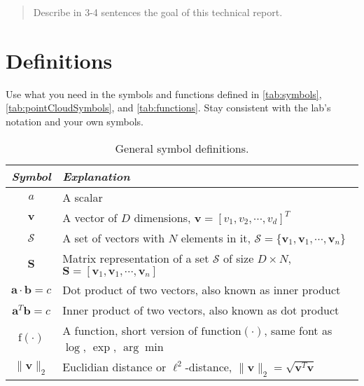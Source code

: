 \documentclass[12pt,letterpaper,oneside]{article}
\begin{document}
\makeCustomTitle
\thispagestyle{titlePage}

\begin{abstract}
Describe in 3-4 sentences the goal of this technical report.
\lightlipsum[1]
\end{abstract}

\section{Definitions}

Use what you need in the symbols and functions defined in \autoref{tab:symbols}, \autoref{tab:pointCloudSymbols}, and \autoref{tab:functions}.
Stay consistent with the lab's notation and your own symbols.

\begin{table}[htbp]
\centering
\caption{General symbol definitions.}
\label{tab:symbols}
\begin{tabu}{cX}

\toprule
\emph{Symbol} & \emph{Explanation} \\

\midrule
$a$ & A scalar \\
$\bm{v}$ & A vector of $D$ dimensions, $\bm{v} = [v_1, v_2, \cdots , v_d]^T$ \\
$\mathcal{S}$ & A set of vectors with $N$ elements in it, $\mathcal{S} = \{\bm{v}_1, \bm{v}_1, \cdots, \bm{v}_n\}$\\
$\bm{S}$ & Matrix representation of a set $\mathcal{S}$ of size $D \times N$, $\bm{S} = [\bm{v}_1, \bm{v}_1, \cdots, \bm{v}_n]$\\
$\bm{a} \cdot \bm{b} = c$ & Dot product of two vectors, also known as inner product \\
$\bm{a}^T \bm{b} = c$ & Inner product of two vectors, also known as dot product \\
$\mathrm{f}(\cdot)$ & A function, short version of $\mathrm{function}(\cdot)$, same font as $\log$, $\exp$, $\arg\min$\\
$\|\bm{v}\|_2$ & Euclidian distance or $\ell^2$-distance, $\|\bm{v}\|_2 = \sqrt{\bm{v}^T \bm{v}}$ \\

\bottomrule

\end{tabu}
\end{table}
\end{document}
